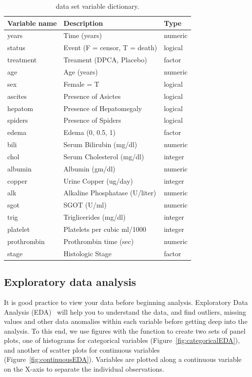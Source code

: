 \documentclass[nojss]{jss}
\begin{document}
\begin{table}

\caption{\label{tab:dta-table}\label{T:dataLabs} data set variable dictionary.}
\centering
\begin{tabular}[t]{lll}
\toprule
Variable name & Description & Type\\
\midrule
years & Time (years) & numeric\\
status & Event (F = censor, T = death) & logical\\
treatment & Treament (DPCA, Placebo) & factor\\
age & Age (years) & numeric\\
sex & Female = T & logical\\
\addlinespace
ascites & Presence of Asictes & logical\\
hepatom & Presence of Hepatomegaly & logical\\
spiders & Presence of Spiders & logical\\
edema & Edema (0, 0.5, 1) & factor\\
bili & Serum Bilirubin (mg/dl) & numeric\\
\addlinespace
chol & Serum Cholesterol (mg/dl) & integer\\
albumin & Albumin (gm/dl) & numeric\\
copper & Urine Copper (ug/day) & integer\\
alk & Alkaline Phosphatase (U/liter) & numeric\\
sgot & SGOT (U/ml) & numeric\\
\addlinespace
trig & Triglicerides (mg/dl) & integer\\
platelet & Platelets per cubic ml/1000 & integer\\
prothrombin & Prothrombin time (sec) & numeric\\
stage & Histologic Stage & factor\\
\bottomrule
\end{tabular}
\end{table}



\subsection{Exploratory data analysis}\label{S:eda}

It is good practice to view your data before beginning analysis. Exploratory Data Analysis (EDA)~\cite{Tukey:1977} will help you to understand the data, and find outliers, missing values and other data anomalies within each variable before getting deep into the analysis. To this end, we use  figures with the  function to create two sets of panel plots, one of histograms for categorical variables  (Figure~\ref{fig:categoricalEDA}), and another of scatter plots for continuous variables (Figure~\ref{fig:continuousEDA}). Variables are plotted along a continuous variable on the X-axis to separate the individual observations.
\end{document}
